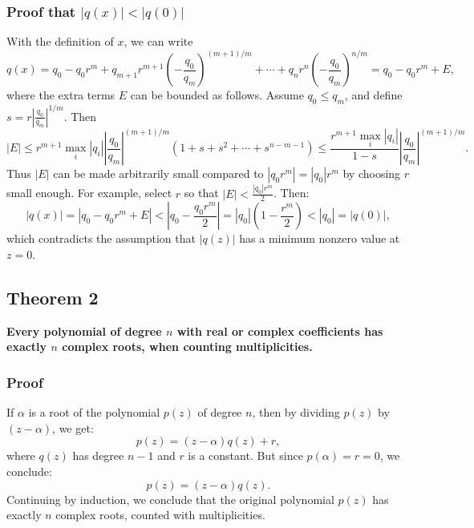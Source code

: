 \subsubsection*{Proof that $|q(x)| < |q(0)|$}
With the definition of $x$, we can write
\[
	q(x) = q_0 - q_0 r^m + q_{m+1} r^{m+1} \left(-\frac{q_0}{q_m}\right)^{(m+1)/m} + \cdots + q_n r^n \left(-\frac{q_0}{q_m}\right)^{n/m} = q_0 - q_0 r^m + E,
\]
where the extra terms $E$ can be bounded as follows. Assume $q_0 \leq q_m$, and define $s = r \left|\frac{q_0}{q_m}\right|^{1/m}$. Then
\[
	|E| \leq r^{m+1} \max_i |q_i| \left|\frac{q_0}{q_m}\right|^{(m+1)/m} (1 + s + s^2 + \cdots + s^{n - m - 1}) \leq \frac{r^{m+1} \max_i |q_i|}{1 - s} \left|\frac{q_0}{q_m}\right|^{(m+1)/m}.
\]
Thus $|E|$ can be made arbitrarily small compared to $|q_0 r^m| = |q_0| r^m$ by choosing $r$ small enough. For example, select $r$ so that $|E| < \frac{|q_0| r^m}{2}$. Then:
\[
	|q(x)| = |q_0 - q_0 r^m + E| < |q_0 - \frac{q_0 r^m}{2}| = |q_0| \left(1 - \frac{r^m}{2}\right) < |q_0| = |q(0)|,
\]
which contradicts the assumption that $|q(z)|$ has a minimum nonzero value at $z = 0$.

\subsection{Theorem 2}
\textbf{Every polynomial of degree $n$ with real or complex coefficients has exactly $n$ complex roots, when counting multiplicities.}

\subsubsection*{Proof}
If $\alpha$ is a root of the polynomial $p(z)$ of degree $n$, then by dividing $p(z)$ by $(z - \alpha)$, we get:
\[
	p(z) = (z - \alpha) q(z) + r,
\]
where $q(z)$ has degree $n - 1$ and $r$ is a constant. But since $p(\alpha) = r = 0$, we conclude:
\[
	p(z) = (z - \alpha) q(z).
\]
Continuing by induction, we conclude that the original polynomial $p(z)$ has exactly $n$ complex roots, counted with multiplicities.

\newpage
